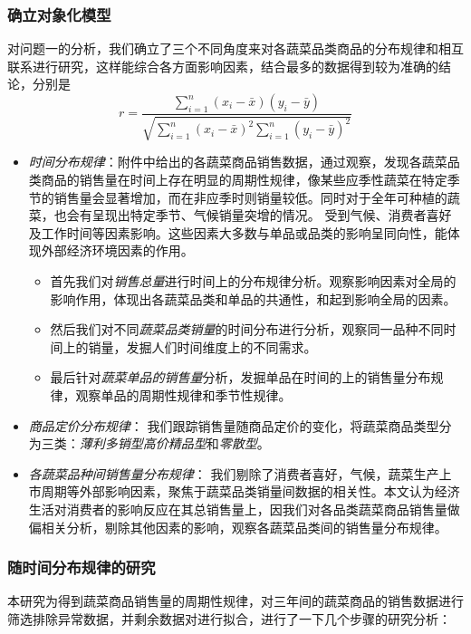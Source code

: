 \documentclass{article}
\begin{document}
\subsubsection{确立对象化模型}
对问题一的分析，我们确立了三个不同角度来对各蔬菜品类商品的分布规律和相互联系进行研究，这样能综合各方面影响因素，结合最多的数据得到较为准确的结论，分别是
\[
r = \frac{
    \sum_{i=1}^{n} (x_i - \bar{x})(y_i - \bar{y})
}{
    \sqrt{
        \sum_{i=1}^{n} (x_i - \bar{x})^2
        \sum_{i=1}^{n} (y_i - \bar{y})^2
    }
}
\]
\begin{itemize}
    \item \textit{时间分布规律}：附件中给出的各蔬菜商品销售数据，通过观察，发现各蔬菜品类商品的销售量在时间上存在明显的周期性规律，像某些应季性蔬菜在特定季节的销售量会显著增加，而在非应季时则销量较低。同时对于全年可种植的蔬菜，也会有呈现出特定季节、气候销量突增的情况。
    受到气候、消费者喜好及工作时间等因素影响。这些因素大多数与单品或品类的影响呈同向性，能体现外部经济环境因素的作用。

    \begin{itemize}
        \item 首先我们对\textit{销售总量}进行时间上的分布规律分析。观察影响因素对全局的影响作用，体现出各蔬菜品类和单品的共通性，和起到影响全局的因素。
        \item 然后我们对不同\textit{蔬菜品类销量}的时间分布进行分析，观察同一品种不同时间上的销量，发掘人们时间维度上的不同需求。
        \item 最后针对\textit{蔬菜单品的销售量}分析，发掘单品在时间的上的销售量分布规律，观察单品的周期性规律和季节性规律。
    \end{itemize}
    
    \item \textit{商品定价分布规律}：
    我们跟踪销售量随商品定价的变化，将蔬菜商品类型分为三类：\textit{薄利多销型}\textit{高价精品型}和\textit{零散型}。
    \item \textit{各蔬菜品种间销售量分布规律}：
    我们剔除了消费者喜好，气候，蔬菜生产上市周期等外部影响因素，聚焦于蔬菜品类销量间数据的相关性。本文认为经济生活对消费者的影响反应在其总销售量上，因我们对各品类蔬菜商品销售量做偏相关分析，剔除其他因素的影响，观察各蔬菜品类间的销售量分布规律。
\end{itemize}

\subsubsection{随时间分布规律的研究}
本研究为得到蔬菜商品销售量的周期性规律，对三年间的蔬菜商品的销售数据进行筛选排除异常数据，并剩余数据对进行拟合，进行了一下几个步骤的研究分析：
\end{document}
